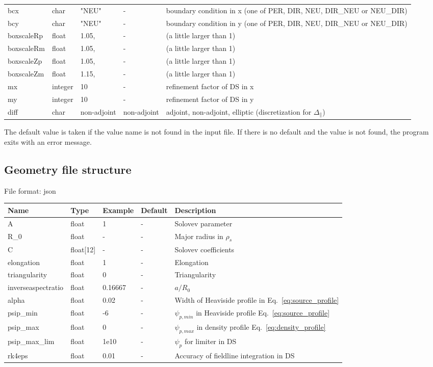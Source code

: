 \begin{longtable}{llll>{\RaggedRight}p{7cm}}
  bcx   & char & "NEU"      & - & boundary condition in x (one of PER, DIR, NEU, DIR\_NEU or NEU\_DIR) \\
  bcy   & char & "NEU"      & - & boundary condition in y (one of PER, DIR, NEU, DIR\_NEU or NEU\_DIR) \\
  boxscaleRp & float &  1.05, & - & (a little larger than 1) \\
  boxscaleRm & float &  1.05, & - & (a little larger than 1) \\
  boxscaleZp & float &  1.05, & - & (a little larger than 1) \\
  boxscaleZm & float &  1.15, & - & (a little larger than 1) \\
  mx     & integer & 10 & - & refinement factor of DS in x \\
  my     & integer & 10 & - & refinement factor of DS in y \\
  diff       & char & non-adjoint & non-adjoint & adjoint, non-adjoint, elliptic (discretization for $\Delta_\parallel$) \\
\bottomrule
\end{longtable}

The default value is taken if the value name is not found in the input file. If there is no default and
the value is not found,
the program exits with an error message.

\subsection{Geometry file structure}
File format: json

\begin{longtable}{llll>{\RaggedRight}p{7cm}}
\toprule
\rowcolor{gray!50}\textbf{Name} &  \textbf{Type} & \textbf{Example} & \textbf{Default} & \textbf{Description}  \\ \midrule
    A      & float & 1 &  - & Solovev parameter \\
    R\_0   & float & - & -  & Major radius in $\rho_s$ \\
    C      & float[12] &  - & - & Solovev coefficients \\
    elongation & float & 1 & - & Elongation \\
    triangularity & float & 0 & - & Triangularity \\
    inverseaspectratio & float & 0.16667 & - & $a/R_0$ \\
    alpha  & float & 0.02 & - & Width of Heaviside profile in Eq.~\eqref{eq:source_profile} \\
    psip\_min & float & -6 & - & $\psi_{p,min}$ in Heaviside profile Eq.~\eqref{eq:source_profile} \\
    psip\_max & float & 0 & - & $\psi_{p,max}$ in density profile Eq.~\eqref{eq:density_profile} \\
    psip\_max\_lim & float & 1e10 & - & $\psi_p$ for limiter in DS \\
    rk4eps & float & 0.01 & - & Accuracy of fieldline integration in DS \\
\bottomrule
\end{longtable}


